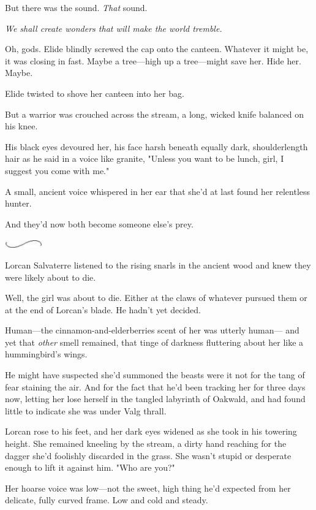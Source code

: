 But there was the sound. \emph{That} sound.

\emph{We shall create wonders that will make the world tremble.}

Oh, gods. Elide blindly screwed the cap onto the canteen. Whatever it might be, it was closing in fast. Maybe a tree---high up a tree---might save her. Hide her. Maybe.

Elide twisted to shove her canteen into her bag.

But a warrior was crouched across the stream, a long, wicked knife balanced on his knee.

His black eyes devoured her, his face harsh beneath equally dark, shoulderlength hair as he said in a voice like granite, "Unless you want to be lunch, girl, I suggest you come with me."

A small, ancient voice whispered in her ear that she'd at last found her relentless hunter.

And they'd now both become someone else's prey.

\includegraphics[width=0.65in,height=0.13in]{images/seperator}

Lorcan Salvaterre listened to the rising snarls in the ancient wood and knew they were likely about to die.

Well, the girl was about to die. Either at the claws of whatever pursued them or at the end of Lorcan's blade. He hadn't yet decided.

Human---the cinnamon-and-elderberries scent of her was utterly human--- and yet that \emph{other} smell remained, that tinge of darkness fluttering about her like a hummingbird's wings.

He might have suspected she'd summoned the beasts were it not for the tang of fear staining the air. And for the fact that he'd been tracking her for three days now, letting her lose herself in the tangled labyrinth of Oakwald, and had found little to indicate she was under Valg thrall.

Lorcan rose to his feet, and her dark eyes widened as she took in his towering height. She remained kneeling by the stream, a dirty hand reaching for the dagger she'd foolishly discarded in the grass. She wasn't stupid or desperate enough to lift it against him. "Who are you?"

Her hoarse voice was low---not the sweet, high thing he'd expected from her delicate, fully curved frame. Low and cold and steady.

